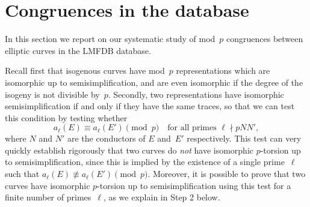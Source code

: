 \documentclass[12pt]{amsart}
\numberwithin{equation}{section}
\theoremstyle{definition}
\theoremstyle{remark}
\begin{document}
\section{Congruences in the database}\label{S:statistics}

In this section we report on our systematic study of mod~$p$
congruences between elliptic curves in the LMFDB database.

Recall first
that isogenous curves have mod~$p$ representations which are
isomorphic up to semisimplification, and are even isomorphic if the
degree of the isogeny is not divisible by~$p$.  Secondly, two
representations have isomorphic semisimplification if and only if they
have the same traces, so that we can test this condition by testing
whether 
\[ a_{\ell}(E)\equiv a_{\ell}(E')\pmod{p}
\quad \text{for all primes } \ell \nmid pNN',
\] 
where $N$ and $N'$ are the conductors of $E$
and~$E'$ respectively.  This test can very quickly establish rigorously
that two curves do \emph{not} have isomorphic $p$-torsion up to
semisimplification, since this is implied by the existence of a single
prime~$\ell$ such that $a_{\ell}(E)\not\equiv a_{\ell}(E')\pmod{p}$.
Moreover, it is possible to prove that two curves have isomorphic $p$-torsion up to
semisimplification using this test for a finite number of
primes~$\ell$, as we explain in Step 2 below.
\end{document}
